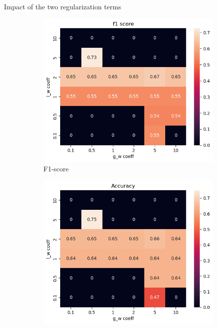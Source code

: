 \documentclass[french]{beamer}
\begin{document}
\begin{frame}{Impact of the two regularization terms}

    \begin{figure}[h]
        \centering
        \begin{subfigure}{0.32\textwidth}
            \includegraphics[width=\textwidth]{figures/f1_score_results.png}
            \caption{F1-score}
            \label{fig:f1_score}
        \end{subfigure}
        \begin{subfigure}{0.32\textwidth}
            \includegraphics[width=\textwidth]{figures/accuracy_results.png}

\end{subfigure}
\end{figure}
\end{frame}
\end{document}
